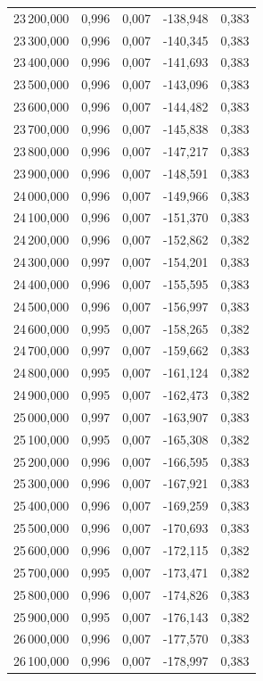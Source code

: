 \begin{longtable}{rrrrr}
23\,200,000 & 0,996 & 0,007 & -138,948 & 0,383\\
23\,300,000 & 0,996 & 0,007 & -140,345 & 0,383\\
23\,400,000 & 0,996 & 0,007 & -141,693 & 0,383\\
23\,500,000 & 0,996 & 0,007 & -143,096 & 0,383\\
23\,600,000 & 0,996 & 0,007 & -144,482 & 0,383\\
23\,700,000 & 0,996 & 0,007 & -145,838 & 0,383\\
23\,800,000 & 0,996 & 0,007 & -147,217 & 0,383\\
23\,900,000 & 0,996 & 0,007 & -148,591 & 0,383\\
24\,000,000 & 0,996 & 0,007 & -149,966 & 0,383\\
24\,100,000 & 0,996 & 0,007 & -151,370 & 0,383\\
24\,200,000 & 0,996 & 0,007 & -152,862 & 0,382\\
24\,300,000 & 0,997 & 0,007 & -154,201 & 0,383\\
24\,400,000 & 0,996 & 0,007 & -155,595 & 0,383\\
24\,500,000 & 0,996 & 0,007 & -156,997 & 0,383\\
24\,600,000 & 0,995 & 0,007 & -158,265 & 0,382\\
24\,700,000 & 0,997 & 0,007 & -159,662 & 0,383\\
24\,800,000 & 0,995 & 0,007 & -161,124 & 0,382\\
24\,900,000 & 0,995 & 0,007 & -162,473 & 0,382\\
25\,000,000 & 0,997 & 0,007 & -163,907 & 0,383\\
25\,100,000 & 0,995 & 0,007 & -165,308 & 0,382\\
25\,200,000 & 0,996 & 0,007 & -166,595 & 0,383\\
25\,300,000 & 0,996 & 0,007 & -167,921 & 0,383\\
25\,400,000 & 0,996 & 0,007 & -169,259 & 0,383\\
25\,500,000 & 0,996 & 0,007 & -170,693 & 0,383\\
25\,600,000 & 0,996 & 0,007 & -172,115 & 0,382\\
25\,700,000 & 0,995 & 0,007 & -173,471 & 0,382\\
25\,800,000 & 0,996 & 0,007 & -174,826 & 0,383\\
25\,900,000 & 0,995 & 0,007 & -176,143 & 0,382\\
26\,000,000 & 0,996 & 0,007 & -177,570 & 0,383\\
26\,100,000 & 0,996 & 0,007 & -178,997 & 0,383\\

\end{longtable}
